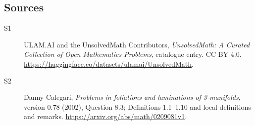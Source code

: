 \documentclass[11pt]{article}
\begin{document}
\subsection{Sources}
\begin{description}
\item[\hypertarget{source:statement:1}{S1}] ULAM.AI and the UnsolvedMath Contributors, \emph{UnsolvedMath: A Curated Collection of Open Mathematics Problems}, catalogue entry. CC BY 4.0. \url{https://huggingface.co/datasets/ulamai/UnsolvedMath}.
\item[\hypertarget{source:statement:2}{S2}] Danny Calegari, \emph{Problems in foliations and laminations of 3-manifolds}, version 0.78 (2002), Question 8.3; Definitions 1.1--1.10 and local definitions and remarks. \url{https://arxiv.org/abs/math/0209081v1}.
\end{description}
\label{end:statement}
\end{document}
